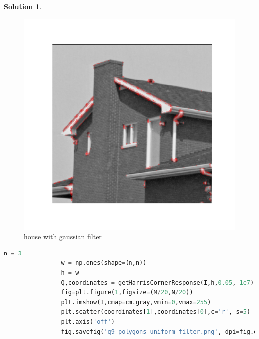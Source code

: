 \documentclass[11pt]{article}
\theoremstyle{plain}
\theoremstyle{definition}
\newtheorem{solution}{Solution}
\theoremstyle{remark}
\begin{document}
\begin{solution}
\begin{enumerate}
			\begin{figure}[h]
				\centering
				\includegraphics[width=\textwidth]{q9_house_gaussian_filter.png}
				\caption{house with gaussian filter}
			\end{figure}
			
			\begin{lstlisting}[language=Python, caption=polygon with uniform filter]
				n = 3
				w = np.ones(shape=(n,n))
				h = w
				Q,coordinates = getHarrisCornerResponse(I,h,0.05, 1e7)
				fig=plt.figure(1,figsize=(M/20,N/20))
				plt.imshow(I,cmap=cm.gray,vmin=0,vmax=255)
				plt.scatter(coordinates[1],coordinates[0],c='r', s=5)
				plt.axis('off')
				fig.savefig('q9_polygons_uniform_filter.png', dpi=fig.dpi)
			\end{lstlisting}
			

\end{enumerate}
\end{solution}
\end{document}
